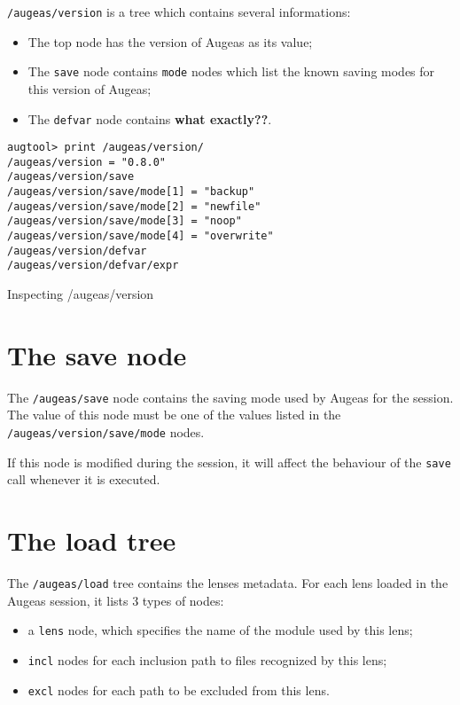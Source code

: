 \nolinkurl{/augeas/version} is a tree which contains several informations:

\begin{itemize}
\item
  The top node has the version of Augeas as its value;
\item
  The \verb!save! node contains \verb!mode! nodes which list the known saving modes for this version of Augeas;
\item
  The \verb!defvar! node contains \textbf{what exactly??}.
\end{itemize}


\begin{listing}
  \begin{verbatim}
augtool> print /augeas/version/
/augeas/version = "0.8.0"
/augeas/version/save
/augeas/version/save/mode[1] = "backup"
/augeas/version/save/mode[2] = "newfile"
/augeas/version/save/mode[3] = "noop"
/augeas/version/save/mode[4] = "overwrite"
/augeas/version/defvar
/augeas/version/defvar/expr
  \end{verbatim}
  \caption{Inspecting /augeas/version}
  \label{lst:metadata_version}
\end{listing}


\section{The save node}

\label{sec:save_node} 

The \nolinkurl{/augeas/save} node contains the saving mode used by Augeas for the session. The value of this node must be one of the values listed in the \nolinkurl{/augeas/version/save/mode} nodes.

If this node is modified during the session, it will affect the behaviour of the \verb!save! call whenever it is executed.

\section{The load tree}


The \nolinkurl{/augeas/load} tree contains the lenses metadata. For each lens loaded in the Augeas session, it lists 3 types of nodes:

\begin{itemize}
\item
  a \verb!lens! node, which specifies the name of the module used by this lens;
\item
  \verb!incl! nodes for each inclusion path to files recognized by this lens;
\item
  \verb!excl! nodes for each path to be excluded from this lens.
\end{itemize}

